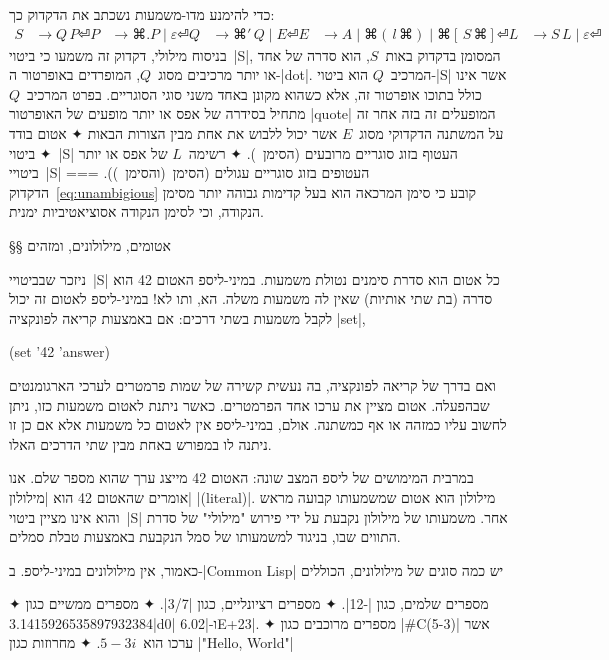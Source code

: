 כדי להימנע מדו-משמעות נשכתב את הדקדוק כך:
\newcommand \Or{\;|\;}
\newcommand \Then{\, }
\begin{equation}\label{eq:unambigious}
  \begin{split}
     S &→Q \, P ⏎
    P &→⌘{.} P \Or ε ⏎
    Q &→⌘{'} \Then Q \Or E ⏎
     E &→A \Or ⌘(\Then l \Then ⌘) \Or ⌘[ \Then S \Then ⌘] ⏎
     L &→S \Then L \Or ε ⏎
  \end{split}
\end{equation}
בניסוח מילולי, דקדוק זה משמעו כי ביטוי~\E|S|, המסומן בדקדוק באות~$S$, הוא סדרה
של אחד או יותר מרכיבים מסוג~$Q$, המופרדים באופרטור ה-\E|dot|.
המרכיב~$Q$ הוא ביטוי-\E|S| אשר אינו כולל בתוכו אופרטור זה, אלא כשהוא
מקונן באחד משני סוגי הסוגריים. בפרט המרכיב~$Q$ מתחיל בסידרה של אפס או יותר
מופעים של האופרטור \E|quote| המופעלים זה בזה אחר זה על המשתנה הדקדוקי
מסוג~$E$ אשר יכול
ללבוש את אחת מבין הצורות הבאות
✦ אטום בודד
✦ ביטוי~\E|S| העטוף בזוג סוגריים מרובעים (הסימן~\cc[ והסימן~\cc]).
✦ רשימה~$L$ של אפס או יותר ביטויי~\E|S| העטופים בזוג סוגריים עגולים (הסימן~\cc(והסימן~\cc)).
===
 הדקדוק~\ref{eq:unambigious} קובע כי סימן המרכאה הוא בעל קדימות גבוהה יותר מסימן
 הנקודה, וכי לסימן הנקודה אסוציאטיביות ימנית.

§§ אטומים, מילולונים, ומזהים

ניזכר שבביטויי~\E|S| כל אטום הוא סדרת סימנים נטולת משמעות. במיני-ליספ
האטום 42 הוא סדרה (בת שתי אותיות) שאין לה משמעות משלה. הא, ותו לא! במיני-ליספ
לאטום זה יכול לקבל משמעות בשתי דרכים: אם באמצעות קריאה לפונקציה
\E|set|,
\begin{MINI}
(set '42 'answer)
\end{MINI}
ואם בדרך של קריאה לפונקציה, בה נעשית קשירה של שמות פרמטרים לערכי הארגומנטים
שבהפעלה. אטום מציין את ערכו אחד הפרמטרים. כאשר ניתנת לאטום משמעות כזו, ניתן
לחשוב עליו כמזהה או אף כמשתנה. אולם, במיני-ליספ אין לאטום כל משמעות אלא אם כן
זו ניתנה לו במפורש באחת מבין שתי הדרכים האלו.

במרבית המימושים של ליספ המצב שונה: האטום 42 מייצג ערך שהוא מספר שלם. אנו אומרים
שהאטום 42 הוא \ע|מילולון| \E|(literal)|. מילולון הוא אטום שמשמעותו קבועה מראש
והוא אינו מציין ביטוי~\E|S| אחר. משמעותו של מילולון נקבעת על ידי פירוש "מילולי"
של סדרת התווים שבו, בניגוד למשמעותו של סמל הנקבעת באמצעות טבלת סמלים.

כאמור, אין מילולונים במיני-ליספ. ב-\E|Common Lisp| יש כמה סוגים של מילולונים,
הכוללים
\begin{enumerate}
  ✦ מספרים שלמים, כגון \T|-12|.
  ✦ מספרים רציונליים, כגון \T|3/7|.
  ✦ מספרים ממשיים כגון \T|3.1415926535897932384d0| ו-\T|6.02E+23|.
  ✦ מספרים מרוכבים כגון \T|#C(5-3)| אשר ערכו הוא~$5-3i$.
  ✦ מחרוזות כגון \T|"Hello, World"|
\end{enumerate}

